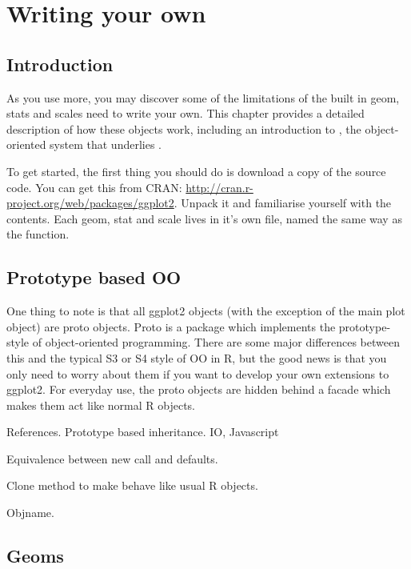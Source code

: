 

\chapter{Writing your own}
\label{cha:writing-your-own}

\section{Introduction}

As you use \ggplot more, you may discover some of the limitations of the built in geom, stats and scales need to write your own.  This chapter provides a detailed description of how these objects work, including an introduction to , the object-oriented system that underlies \ggplot.

To get started, the first thing you should do is download a copy of the source code.  You can get this from CRAN: \url{http://cran.r-project.org/web/packages/ggplot2}.  Unpack it and familiarise yourself with the contents.  Each geom, stat and scale lives in it's own file, named the same way as the function.  

\section{Prototype based OO} %
\label{sec:proto}

One thing to note is that all ggplot2 objects (with the exception of the main plot object) are proto objects.  Proto is a package which implements the prototype-style of object-oriented programming.  There are some major differences between this and the typical S3 or S4 style of OO in R, but the good news is that you only need to worry about them if you want to develop your own extensions to ggplot2.  For everyday use, the proto objects are hidden behind a facade which makes them act like normal R objects.


References.
Prototype based inheritance.  IO, Javascript

Equivalence between new call and defaults.

Clone method to make behave like usual R objects.

Objname.

\section{Geoms}
\label{sec:own-geom}

